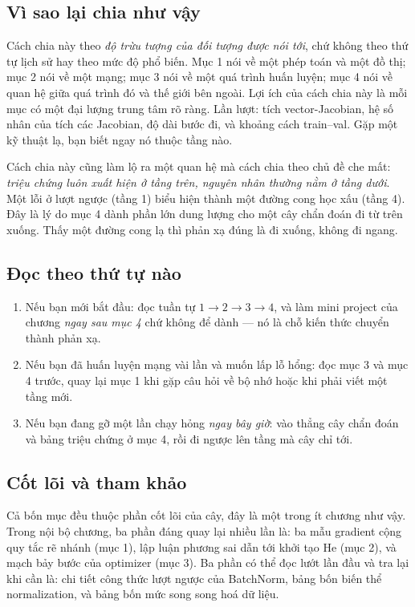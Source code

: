 \documentclass[../../deep_learning.tex]{subfiles}
\begin{document}
\subsection*{Vì sao lại chia như vậy}
Cách chia này theo \emph{độ trừu tượng của đối tượng được nói tới}, chứ không theo thứ tự lịch sử hay theo mức độ phổ biến. Mục 1 nói về một phép toán và một đồ thị; mục 2 nói về một mạng; mục 3 nói về một quá trình huấn luyện; mục 4 nói về quan hệ giữa quá trình đó và thế giới bên ngoài. Lợi ích của cách chia này là mỗi mục có một đại lượng trung tâm rõ ràng. Lần lượt: tích vector-Jacobian, hệ số nhân của tích các Jacobian, độ dài bước đi, và khoảng cách train--val. Gặp một kỹ thuật lạ, bạn biết ngay nó thuộc tầng nào.

Cách chia này cũng làm lộ ra một quan hệ mà cách chia theo chủ đề che mất: \emph{triệu chứng luôn xuất hiện ở tầng trên, nguyên nhân thường nằm ở tầng dưới}. Một lỗi ở lượt ngược (tầng 1) biểu hiện thành một đường cong học xấu (tầng 4). Đây là lý do mục 4 dành phần lớn dung lượng cho một cây chẩn đoán đi từ trên xuống. Thấy một đường cong lạ thì phản xạ đúng là đi xuống, không đi ngang.

\subsection*{Đọc theo thứ tự nào}
\begin{enumerate}
\item Nếu bạn mới bắt đầu: đọc tuần tự \(1 \rightarrow 2 \rightarrow 3 \rightarrow 4\), và làm mini project của chương \emph{ngay sau mục 4} chứ không để dành --- nó là chỗ kiến thức chuyển thành phản xạ.
\item Nếu bạn đã huấn luyện mạng vài lần và muốn lấp lỗ hổng: đọc mục 3 và mục 4 trước, quay lại mục 1 khi gặp câu hỏi về bộ nhớ hoặc khi phải viết một tầng mới.
\item Nếu bạn đang gỡ một lần chạy hỏng \emph{ngay bây giờ}: vào thẳng cây chẩn đoán và bảng triệu chứng ở mục 4, rồi đi ngược lên tầng mà cây chỉ tới.
\end{enumerate}

\subsection*{Cốt lõi và tham khảo}
Cả bốn mục đều thuộc phần cốt lõi của cây, đây là một trong ít chương như vậy. Trong nội bộ chương, ba phần đáng quay lại nhiều lần là: ba mẫu gradient cộng quy tắc rẽ nhánh (mục 1), lập luận phương sai dẫn tới khởi tạo He (mục 2), và mạch bảy bước của optimizer (mục 3). Ba phần có thể đọc lướt lần đầu và tra lại khi cần là: chi tiết công thức lượt ngược của BatchNorm, bảng bốn biến thể normalization, và bảng bốn mức song song hoá dữ liệu.
\end{document}
